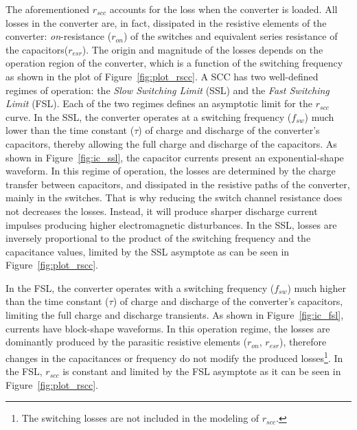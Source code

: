 The aforementioned $r_{scc}$ accounts for the loss when the converter is loaded. All losses in the converter are, in fact, dissipated in the resistive elements of the converter: \emph{on}-resistance ($r_{on}$) of the switches and equivalent series resistance of the capacitors($r_{esr}$). The origin and magnitude of the losses depends on the operation region of the converter, which is a function of the switching frequency as shown in the plot of Figure~\ref{fig:plot_rscc}.
A SCC has two well-defined regimes of operation: the \emph{Slow Switching Limit} (SSL) and the \emph{Fast Switching Limit} (FSL). Each of the two regimes defines an asymptotic limit for the $r_{scc}$ curve. In the SSL, the converter operates at a switching frequency ($f_{sw}$) much lower than the time constant ($\tau$) of charge and discharge of the converter's capacitors, thereby allowing the full charge and discharge of the capacitors. As shown in Figure~\ref{fig:ic_ssl}, the capacitor currents present an exponential-shape waveform. In this regime of operation, the losses are determined by the charge transfer between capacitors, and dissipated in the resistive paths of the converter, mainly in the switches. That is why reducing the switch channel resistance does not decreases the losses. Instead, it will produce sharper discharge current impulses producing higher electromagnetic disturbances. In the SSL, losses are inversely proportional to the product of the switching frequency and the capacitance values, limited by the SSL asymptote as can be seen in Figure~\ref{fig:plot_rscc}.

In the FSL, the converter operates with a switching frequency ($f_{sw}$) much higher than the time constant ($\tau$) of charge and discharge of the converter's capacitors, limiting the full charge and discharge transients. As shown in Figure~\ref{fig:ic_fsl}, currents have block-shape waveforms. In this operation regime, the losses are dominantly produced by the parasitic resistive elements ($r_{on}$, $r_{esr}$), therefore changes in the capacitances or frequency do not modify the produced losses\footnote{The switching losses are not included in the modeling of $r_{scc}$. }. In the FSL, $r_{scc}$ is constant and limited by the FSL asymptote as it can be seen in Figure~\ref{fig:plot_rscc}.


